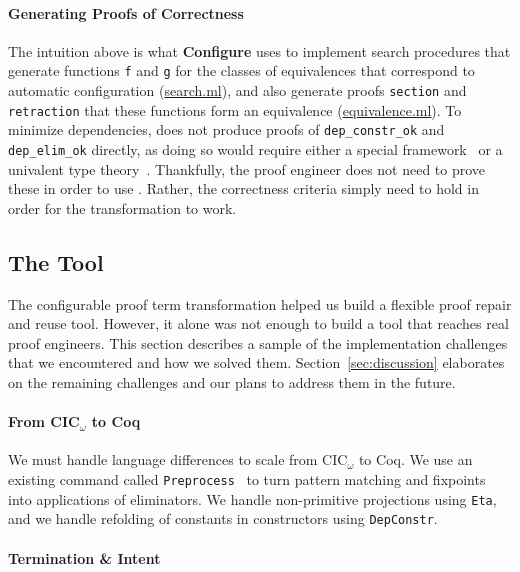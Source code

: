 \paragraph{Generating Proofs of Correctness}
The intuition above is what
\textbf{Configure} uses to implement search procedures that generate functions \lstinline{f} and \lstinline{g} for the classes of equivalences
that correspond to automatic configuration (\href{https://github.com/uwplse/pumpkin-pi/blob/master/plugin/src/automation/search/search.ml}{search.ml}), and also
generate proofs \lstinline{section} and \lstinline{retraction} that these functions form an equivalence (\href{https://github.com/uwplse/pumpkin-pi/blob/master/plugin/src/automation/search/equivalence.ml}{equivalence.ml}).
To minimize dependencies, \toolname does not produce proofs of \lstinline{dep_constr_ok} and \lstinline{dep_elim_ok} directly,
as doing so would require either a special framework~\cite{tabareau2017equivalences}
or a univalent type theory~\cite{univalent2013homotopy}.
Thankfully, the proof engineer does not need to prove these in order to use \toolname.
Rather, the correctness criteria simply need to hold in order for the transformation to work.

\subsection{The Tool}
\label{sec:implementation}

The configurable proof term transformation helped us build a flexible proof repair and reuse tool.
However, it alone was not enough to build a tool that reaches real proof engineers.
This section describes a sample of the implementation challenges that we encountered and how we solved them.
Section~\ref{sec:discussion} elaborates on the remaining challenges and our plans to address them in the future.

\paragraph{From CIC$_{\omega}$ to Coq}

We must handle language differences to scale from CIC$_{\omega}$ to Coq.
We use an existing command called \lstinline{Preprocess}~\cite{Ringer2019} to turn pattern matching and fixpoints into 
applications of eliminators.
We handle non-primitive projections using \lstinline{Eta}, and we handle refolding of constants in constructors
using \lstinline{DepConstr}.

\paragraph{Termination \& Intent}

